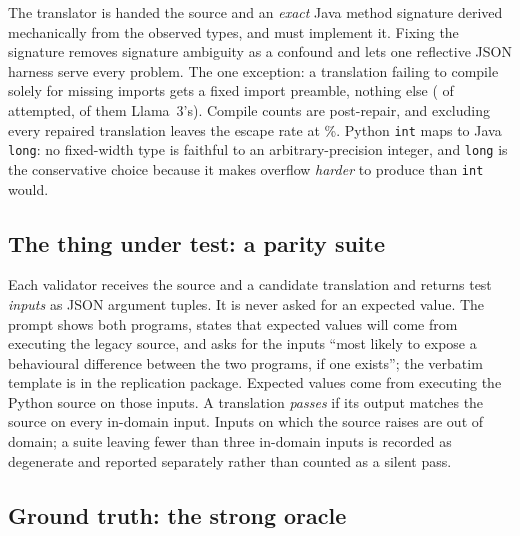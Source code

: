 \documentclass[sigconf]{acmart}
\begin{document}
The translator is handed the source and an \emph{exact} Java method signature derived
mechanically from the observed types, and must implement it. Fixing the signature removes
signature ambiguity as a confound and lets one reflective JSON harness serve every problem.
The one exception: a translation failing to compile solely for missing imports gets a fixed
import preamble, nothing else (\NRepairedTranslations{} of \NAttempted{} attempted,
\NRepairedLlama{} of them Llama~3's). Compile counts are post-repair, and excluding every
repaired translation leaves the escape rate at \EscapeExclRepaired\%. Python \texttt{int} maps to Java \texttt{long}: no
fixed-width type is faithful to an arbitrary-precision integer, and \texttt{long} is the
conservative choice because it makes overflow \emph{harder} to produce than \texttt{int} would.

\subsection{The thing under test: a parity suite}

Each validator receives the source and a candidate translation and returns \KParity{} test
\emph{inputs} as JSON argument tuples. It is never asked for an expected value. The prompt
shows both programs, states that expected values will come from executing the legacy source,
and asks for the inputs ``most likely to expose a behavioural difference between the two
programs, if one exists''; the verbatim template is in the replication package. Expected values
come from executing the Python source on those inputs. A translation \emph{passes} if its output matches
the source on every in-domain input. Inputs on which the source raises are out of domain; a suite
leaving fewer than three in-domain inputs is recorded as degenerate and reported separately
rather than counted as a silent pass.

\subsection{Ground truth: the strong oracle}
\end{document}

